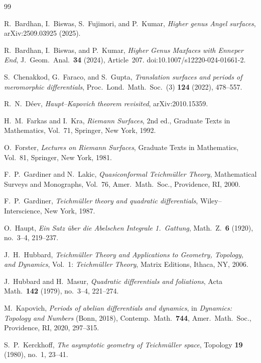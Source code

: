 \documentclass[a4paper,12pt]{amsart}
\theoremstyle{plain}
\theoremstyle{definition}
\begin{document}
\begin{thebibliography}{99}

R.~Bardhan, I.~Biswas, S.~Fujimori, and P.~Kumar,
\emph{Higher genus Angel surfaces},
arXiv:2509.03925 (2025).

R.~Bardhan, I.~Biswas, and P.~Kumar,
\emph{Higher Genus Maxfaces with Enneper End},
J.\ Geom.\ Anal.\ \textbf{34} (2024), Article~207.
doi:10.1007/s12220-024-01661-2.

S.~Chenakkod, G.~Faraco, and S.~Gupta,
\emph{Translation surfaces and periods of meromorphic differentials},
Proc.\ Lond.\ Math.\ Soc.\ (3) \textbf{124} (2022), 478--557.

R.~N.~D\'eev,
\emph{Haupt--Kapovich theorem revisited},
arXiv:2010.15359.

H.~M.~Farkas and I.~Kra,
\emph{Riemann Surfaces},
2nd ed., Graduate Texts in Mathematics, Vol.~71,
Springer, New York, 1992.

O.~Forster,
\emph{Lectures on Riemann Surfaces},
Graduate Texts in Mathematics, Vol.~81,
Springer, New York, 1981.

F.~P.~Gardiner and N.~Lakic,
\emph{Quasiconformal Teichm\"uller Theory},
Mathematical Surveys and Monographs, Vol.~76,
Amer.\ Math.\ Soc., Providence, RI, 2000.

F.~P.~Gardiner,
\emph{Teichm\"uller theory and quadratic differentials},
Wiley--Interscience, New York, 1987.

O.~Haupt,
\emph{Ein Satz \"uber die Abelschen Integrale 1.\ Gattung},
Math.\ Z.\ \textbf{6} (1920), no.~3--4, 219--237.

J.~H.~Hubbard,
\emph{Teichm\"uller Theory and Applications to Geometry, Topology, and Dynamics},
Vol.~1: \emph{Teichm\"uller Theory},
Matrix Editions, Ithaca, NY, 2006.

J.~Hubbard and H.~Masur,
\emph{Quadratic differentials and foliations},
Acta Math.\ \textbf{142} (1979), no.~3--4, 221--274.

M.~Kapovich,
\emph{Periods of abelian differentials and dynamics},
in \emph{Dynamics: Topology and Numbers} (Bonn, 2018),
Contemp.\ Math.\ \textbf{744}, Amer.\ Math.\ Soc., Providence, RI, 2020, 297--315.

S.~P.~Kerckhoff,
\emph{The asymptotic geometry of Teichm\"uller space},
Topology \textbf{19} (1980), no.~1, 23--41.


\end{thebibliography}
\end{document}
